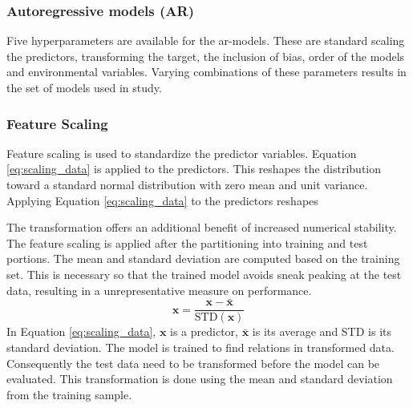 \subsubsection{Autoregressive models (AR)}
Five hyperparameters are available for the \acrshort{ar}-models. These are standard scaling the predictors, transforming the target, the inclusion of bias, order of the models and environmental variables. Varying combinations of these parameters results in the set of models used in study. 

\subsubsection{Feature Scaling} \label{sec:scaling_predictors}
Feature scaling is used to standardize the predictor variables.
Equation \eqref{eq:scaling_data} is applied to the predictors. This 
reshapes the distribution toward a standard normal distribution with zero mean and unit variance. 
Applying Equation \eqref{eq:scaling_data} to the predictors reshapes %

The transformation offers an additional benefit of increased numerical stability. %
The feature scaling is applied after the partitioning into training and test portions. The mean and standard deviation are computed based on the training set. This is necessary so that the trained model avoids sneak peaking at the test data, resulting in a unrepresentative measure on performance.
\begin{equation} \label{eq:scaling_data}
    \mathbf{x} = \frac{\mathbf{x} - \bar{\mathbf{x}}}{\text{STD}(\mathbf{x})}
\end{equation}
In Equation \eqref{eq:scaling_data}, $\mathbf{x}$ is a predictor,  $\bar{\mathbf{x}}$ is its average and STD is its standard deviation. The model is trained to find relations in transformed data. Consequently the test data need to be transformed before the model can be evaluated. This transformation is done using the mean and standard deviation from the training sample.

